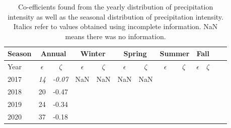 \begin{table}[htb]
  \begin{center}
    \begin{tabular}{|l|*{11}{c|}r|}
      \hline
      Season    &       \multicolumn{2}{|c|}{Annual}          & \multicolumn{2}{|c|}{Winter}& \multicolumn{2}{|c|}{Spring}  & \multicolumn{2}{|c|}{Summer} &\multicolumn{2}{|c|}{Fall}  \\
      \hline
      Year      & $\epsilon $ & $\zeta$  &  $\epsilon $ & $\zeta$  &  $\epsilon $ & $\zeta$  &  $\epsilon $ & $\zeta$  & $\epsilon $ & $\zeta$ \\
      \hline
      2017      & \textit{14}  & \textit{-0.07}  & NaN & NaN & NaN & NaN &   &   &   &   \\
      2018      & 20           & -0.47  &  &  &  &  &   &   &  &   \\
      2019      & 24           & -0.34  &  &  &  &  &  &  &  &   \\
      2020      & 37          & -0.18  &  &  &  &  &   &  &  & \\
      \hline
    \end{tabular}
  \end{center}
  \caption[Year comparison of
    coefficients for precipitation intensity]{\label{fourthtable}Co-efficients found from the
    yearly distribution of precipitation intensity as well as the seasonal distribution of precipitation intensity. Italics refer to values obtained
    using incomplete information. NaN means there was no
    information. }
\end{table}